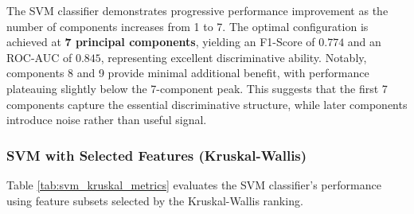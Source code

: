 \documentclass[12pt,a4paper]{article}
\begin{document}
The SVM classifier demonstrates progressive performance improvement as the number of components increases from 1 to 7. The optimal configuration is achieved at \textbf{7 principal components}, yielding an F1-Score of $0.774$ and an ROC-AUC of $0.845$, representing excellent discriminative ability. Notably, components 8 and 9 provide minimal additional benefit, with performance plateauing slightly below the 7-component peak. This suggests that the first 7 components capture the essential discriminative structure, while later components introduce noise rather than useful signal.

\subsubsection*{SVM with Selected Features (Kruskal-Wallis)}

Table \ref{tab:svm_kruskal_metrics} evaluates the SVM classifier's performance using feature subsets selected by the Kruskal-Wallis ranking.

\begin{table}[H]
    \centering
    \caption{Performance of SVM Classifier with Top N Kruskal-Wallis Features (Mean $\pm$ STD).}
    \label{tab:svm_kruskal_metrics}
\end{table}
\end{document}
